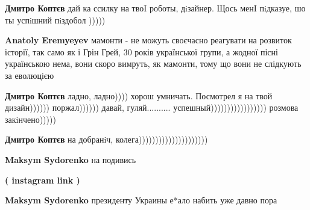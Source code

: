 \begin{itemize}
\begin{itemize}
\begin{itemize}
\textbf{Дмитро Коптєв} дай ка ссилку на твоI роботы, дiзайнер. Щось менI пiдказуе, шо ты успiшний пiздобол )))))

 
\textbf{Anatoly Eremyeyev} мамонти - не можуть своєчасно реагувати на розвиток історії, так само як і Грін Грей, 30 років української групи, а жодної пісні українською нема, вони скоро вимруть, як мамонти, тому що вони не слідкують за еволюцією

 
\textbf{Дмитро Коптєв} ладно, ладно)))) хорош умничать. Посмотрел я на твой дизайн)))))) поржал)))))) давай, гуляй.......... успешный))))))))))))))))) розмова закiнчено)))))

 
\textbf{Дмитро Коптєв} на добранiч, колега)))))))))))))))))))))

\end{itemize}

 
\textbf{Maksym Sydorenko} на подивись

{\bfseries ( instagram link )}

 
\textbf{Maksym Sydorenko} президенту Украины е*ало набить уже давно пора


\end{itemize}
\end{itemize}
